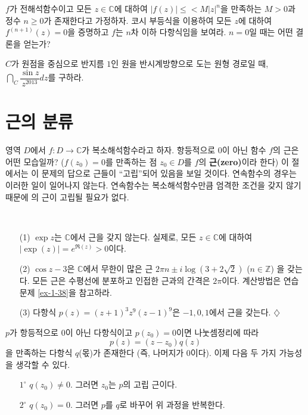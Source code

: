 \begin{salt_exercise} \label{ex-4-15}
$f$가 전해석함수이고 모든 $z\in\mathbb C$에 대하여
$|f(z)| \le < M|z|^n$을 만족하는  $M>0$과 정수 $n\ge0$가 존재한다고 가정하자.
코시 부등식을 이용하여 모든 $z$에 대하여 $f^{(n+1)}(z) = 0$을 증명하고
$f$는 $n$차 이하 다항식임을 보여라. $n=0$일 때는 어떤 결론을 얻는가?
\end{salt_exercise}

\begin{salt_exercise} \label{ex-4-16}
$C$가 원점을 중심으로 반지름 $1$인 원을 반시계방향으로 도는 원형 경로일 때,
$\dint_C \dfrac{\sin z}{z^{2013}}dz$를 구하라.
\end{salt_exercise}

\section{근의 분류}

영역 $D$에서  $f: D\to \mathbb C$가 복소해석함수라고 하자.
항등적으로 $0$이 아닌 함수 $f$의 근은 어떤 모습일까?
($f(z_0)=0$를 만족하는 점 $z_0\in D$를 $f$의 {\bf 근(zero)}이라 한다)
이 절에서는 이 문제의 답으로 근들이 ``고립''되어 있음을 보일 것이다.
연속함수의 경우는 이러한 일이 일어나지 않는다. 
연속함수는 복소해석함수만큼 엄격한 조건을 갖지 않기 때문에
의 근이 고립될 필요가 없다.

\begin{salt_example}\label{example-4-5}
\
\begin{itemize}
\item[(1)] $\exp z$는 $\mathbb C$에서 근을 갖지 않는다.
실제로, 모든 $z\in \mathbb C$에 대하여 $|\exp(z)| = e^{\Re(z)} >0$이다.
\item[(2)] $\cos z - 3$은 $\mathbb C$에서 무한이 많은 근 
$2\pi n \pm i \log(3+2\sqrt{2})$ ($n\in\mathbb Z$)
을 갖는다.
모든 근은 수평선에 분포하고 인접한 근과의 간격은 $2\pi$이다.
계산방법은 연습문제 \ref{ex-1-38}을 참고하라.
\item[(3)] 다항식 $p(z) = (z+1)^3z^9(z-1)^9$은 $-1, 0, 1$에서 근을 갖는다. 
\hfill $\diamondsuit$
\end{itemize}
\end{salt_example}

$p$가 항등적으로 $0$이 아닌 다항식이고 $p(z_0)=0$이면
나눗셈정리에 따라 
\[
p(z) = (z-z_0) q(z)
\]
을 만족하는 다항식 $q$(몫)가 존재한다
(즉, 나머지가 $0$이다). 
이제 다음 두 가지  가능성을 생각할 수 있다.
\begin{itemize}
\item[$1^\circ$] $q(z_0) \ne0$. 그러면 $z_0$는 $p$의 고립 근이다.
\item[$2^\circ$] $q(z_0) =0$. 그러면 $p$를 $q$로 바꾸어 위 과정을 반복한다.
\end{itemize}

